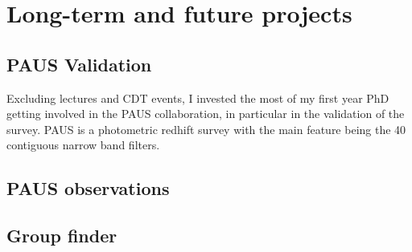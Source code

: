 \documentclass[letterpaper]{article}
\begin{document}
\section{Long-term and future projects}

\subsection{PAUS Validation} 
Excluding lectures and CDT events, I invested the most of my first year PhD getting involved in the PAUS collaboration, in particular in the validation of the survey. PAUS is a photometric redhift survey with the main feature being the 40 contiguous narrow band filters.

\subsection{PAUS observations}
\subsection{Group finder}




\end{document}
